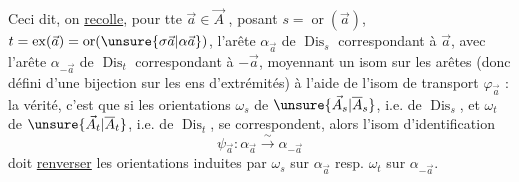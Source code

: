 Ceci dit, on \uline{recolle}, pour tte $\vec a\in\vec A$ , posant $s=\operatorname{or}(\vec a)$, $t=\operatorname{ex}(\vec a)=\operatorname{or}(\unsure{\sigma\vec a|\alpha\vec a})$,  l'arête $\alpha_{\vec a}$ de $\operatorname{Dis}_s$ correspondant à $\vec a$, avec l'arête $\alpha_{-\vec a}$ de $\operatorname{Dis}_t$ correspondant à $-\vec a$, moyennant un isom   sur les arêtes (donc défini  d'une bijection sur les ens d'extrémités)   à l'aide de l'isom de transport $\varphi_{\vec a}$ : la vérité, c'est que si les orientations $\omega_s$ de  $\unsure{\vec A_s|\overline A_s}$, i.e. de $\operatorname{Dis}_s$, et $\omega_t$ de $\unsure{\vec A_t|\overline A_t}$, i.e. de $\operatorname{Dis}_t$, se correspondent, alors l'isom d'identification
\[
\psi_{\vec a}:\alpha_{\vec a}\xrightarrow{\sim}\alpha_{-\vec a}
\]
doit  \uline{renverser} les orientations induites par $\omega_s$ sur $\alpha_{\vec a}$ resp. $\omega_t$ sur $\alpha_{-\vec a}$.
